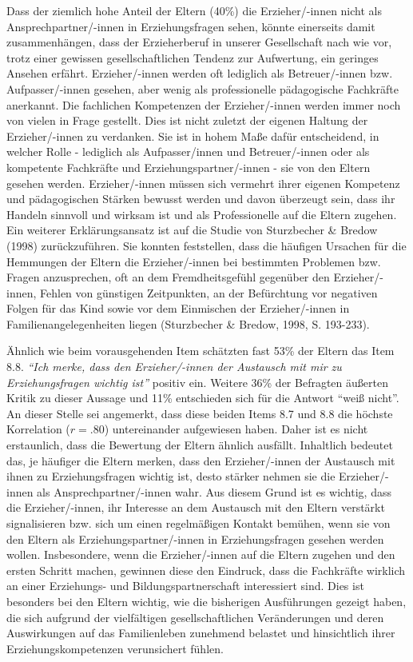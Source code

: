 \documentclass[12pt,a4paper]{article}
\begin{document}
Dass der ziemlich hohe Anteil der Eltern (40\%) die Erzieher/-innen nicht als Ansprechpartner/-innen in Erziehungsfragen sehen, könnte einerseits damit zusammenhängen, dass der Erzieherberuf in unserer Gesellschaft nach wie vor, trotz einer gewissen gesellschaftlichen Tendenz zur Aufwertung, ein geringes Ansehen erfährt. Erzieher/-innen werden oft lediglich als Betreuer/-innen bzw. Aufpasser/-innen gesehen, aber wenig als professionelle pädagogische Fachkräfte anerkannt. Die fachlichen Kompetenzen der Erzieher/-innen werden immer noch von vielen in Frage gestellt. Dies ist nicht zuletzt der eigenen Haltung der Erzieher/-innen zu verdanken. Sie ist in hohem Maße dafür entscheidend, in welcher Rolle - lediglich als Aufpasser/innen und Betreuer/-innen oder als kompetente Fachkräfte und Erziehungspartner/-innen - sie von den Eltern gesehen werden. Erzieher/-innen müssen sich vermehrt ihrer eigenen Kompetenz und pädagogischen Stärken bewusst werden und davon überzeugt sein, dass ihr Handeln sinnvoll und wirksam ist und als Professionelle auf die Eltern zugehen.  
Ein weiterer Erklärungsansatz ist auf die Studie von Sturzbecher \& Bredow (1998) zurückzuführen. Sie konnten feststellen, dass die häufigen Ursachen für die Hemmungen der Eltern die Erzieher/-innen bei bestimmten Problemen bzw. Fragen anzusprechen, oft an dem Fremdheitsgefühl gegenüber den Erzieher/-innen, Fehlen von günstigen Zeitpunkten, an der Befürchtung vor negativen Folgen für das Kind sowie vor dem Einmischen der Erzieher/-innen in Familienangelegenheiten liegen (Sturzbecher \& Bredow, 1998, S. 193-233). 

	Ähnlich wie beim vorausgehenden Item schätzten fast 53\% der Eltern das Item 8.8. \textit{"`Ich merke, dass den Erzieher/-innen der Austausch mit mir zu Erziehungsfragen wichtig ist"'} positiv ein. Weitere 36\% der Befragten äußerten Kritik zu dieser Aussage und 11\% entschieden sich für die Antwort "`weiß nicht"'. An dieser Stelle sei angemerkt, dass diese beiden Items 8.7 und 8.8 die höchste Korrelation ($r = .80$) untereinander aufgewiesen haben. Daher ist es nicht erstaunlich, dass die Bewertung der Eltern ähnlich ausfällt. Inhaltlich bedeutet das, je häufiger die Eltern merken, dass den Erzieher/-innen der Austausch mit ihnen zu Erziehungsfragen wichtig ist, desto stärker nehmen sie die Erzieher/-innen als Ansprechpartner/-innen wahr. Aus diesem Grund ist es wichtig, dass die Erzieher/-innen, ihr Interesse an dem Austausch mit den Eltern verstärkt signalisieren bzw. sich um einen regelmäßigen Kontakt bemühen, wenn sie von den Eltern als Erziehungspartner/-innen in Erziehungsfragen gesehen werden wollen. Insbesondere, wenn die Er\-zieher/-innen auf die Eltern zugehen und den ersten Schritt machen, gewinnen diese den Eindruck, dass die Fachkräfte wirklich an einer Erziehungs- und Bildungspartnerschaft interessiert sind. Dies ist besonders bei den Eltern wichtig, wie die bisherigen Ausführungen gezeigt haben, die sich aufgrund der vielfältigen gesellschaftlichen Veränderungen und deren Auswirkungen auf das Familienleben zunehmend belastet und hinsichtlich ihrer Erziehungskompetenzen verunsichert fühlen.
	
\end{document}
